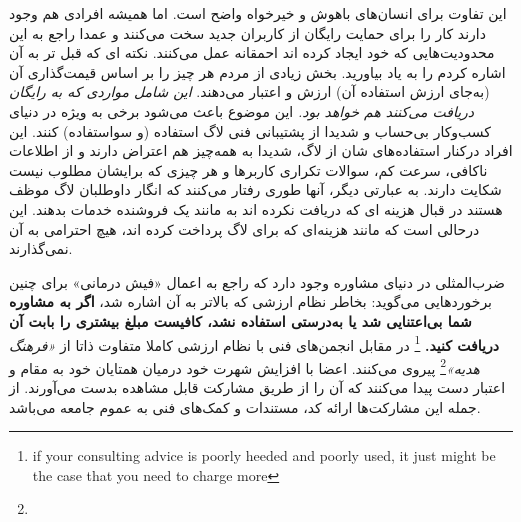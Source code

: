 \begin{caveat}
این تفاوت برای انسان‌های باهوش و خیرخواه واضح است.
اما همیشه افرادی هم وجود دارند کار را برای حمایت رایگان
از کاربران جدید سخت می‌کنند و عمدا راجع به این محدودیت‌هایی
که خود ایجاد کرده اند احمقانه عمل می‌کنند. نکته ای که قبل تر
به آن اشاره کردم را به یاد بیاورید. بخش زیادی از مردم
هر چیز را بر اساس قیمت‌گذاری آن (به‌جای ارزش استفاده آن)
ارزش و اعتبار می‌دهند.
{\itshape
این شامل مواردی که به رایگان دریافت می‌کنند هم خواهد بود.
}
این موضوع باعث می‌شود برخی به ویژه در دنیای کسب‌و‌کار بی‌حساب و شدیدا
از پشتیبانی فنی لاگ استفاده (و سواستفاده) کنند.
این افراد درکنار استفاده‌های شان از لاگ، شدیدا به همه‌چیز هم اعتراض
دارند و از اطلاعات ناکافی، سرعت کم، سوالات تکراری کاربر‌ها و
هر چیزی که برایشان مطلوب نیست شکایت دارند. به عبارتی دیگر،
آنها طوری رفتار می‌کنند که انگار داوطلبان لاگ موظف هستند در قبال
هزینه ای که دریافت نکرده اند به مانند یک فروشنده خدمات بدهند.
این درحالی است که مانند هزینه‌ای که برای لاگ پرداخت کرده اند،
هیچ احترامی به آن نمی‌گذارند.
\end{caveat}

ضرب‌المثلی در دنیای مشاوره وجود دارد که راجع به اعمال «فیش درمانی»
برای چنین برخورد‌هایی می‌گوید: بخاطر نظام ارزشی که بالاتر به آن اشاره شد،
{\bfseries
اگر به مشاوره شما بی‌اعتنایی شد یا به‌درستی استفاده نشد، کافیست
مبلغ بیشتری را بابت آن دریافت کنید.
}
\footnote{if your consulting advice is poorly heeded and poorly used,
it just might be the case that you need to charge more}
در مقابل انجمن‌های فنی با نظام ارزشی کاملا متفاوت
ذاتا از
\emph{«فرهنگ هدیه»}\footnote{}
پیروی می‌کنند.
اعضا با افزایش شهرت خود درمیان همتایان خود به مقام و اعتبار
دست پیدا می‌کنند که آن را از طریق مشارکت قابل مشاهده بدست می‌آورند.
از جمله این مشارکت‌ها ارائه کد، مستندات و کمک‌های فنی به عموم جامعه می‌باشد.

